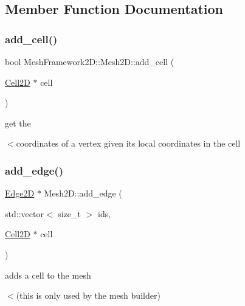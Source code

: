 \subsection{Member Function Documentation}
\mbox{\label{classMeshFramework2D_1_1Mesh2D_aba42962d8cadef92d2d1e6dbfc885646}} 
\subsubsection{\texorpdfstring{add\+\_\+cell()}{add\_cell()}}
{\footnotesize\ttfamily bool Mesh\+Framework2\+D\+::\+Mesh2\+D\+::add\+\_\+cell (\begin{DoxyParamCaption}\item[{\hyperlink{classMeshFramework2D_1_1Cell2D}{Cell2D} $\ast$}]{cell }\end{DoxyParamCaption})\hspace{0.3cm}{\ttfamily [inline]}}



get the 

$<$coordinates of a vertex given its local coordinates in the cell \mbox{\label{classMeshFramework2D_1_1Mesh2D_acfd90ef8444c8f09ec9fbe09f0914c52}} 
\subsubsection{\texorpdfstring{add\+\_\+edge()}{add\_edge()}}
{\footnotesize\ttfamily \hyperlink{classMeshFramework2D_1_1Edge2D}{Edge2D} $\ast$ Mesh2\+D\+::add\+\_\+edge (\begin{DoxyParamCaption}\item[{std\+::vector$<$ size\+\_\+t $>$}]{ids,  }\item[{\hyperlink{classMeshFramework2D_1_1Cell2D}{Cell2D} $\ast$}]{cell }\end{DoxyParamCaption})}



adds a cell to the mesh 

$<$(this is only used by the mesh builder) \mbox{\label{classMeshFramework2D_1_1Mesh2D_a2dc0b35b47bb7789d4b925cc89a2cd6d}} 
